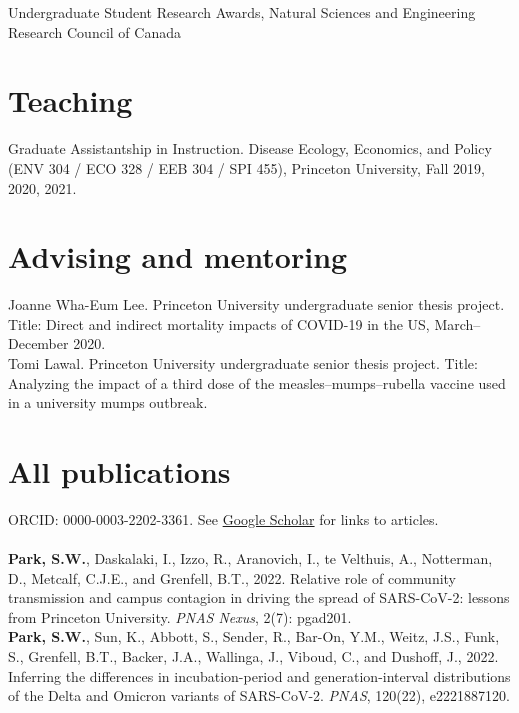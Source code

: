 \documentclass[11pt]{article} %
\begin{document}
 Undergraduate Student Research Awards, Natural Sciences and Engineering Research Council of Canada

\section*{Teaching}

 Graduate Assistantship in Instruction. Disease Ecology, Economics, and Policy (ENV 304 / ECO 328 / EEB 304 / SPI 455), Princeton University, Fall 2019, 2020, 2021.

\section*{Advising and mentoring}

 Joanne Wha-Eum Lee. Princeton University undergraduate senior thesis project. Title: Direct and indirect mortality impacts of COVID-19 in the US, March--December 2020.\\

 Tomi Lawal. Princeton University undergraduate senior thesis project. Title: Analyzing the impact of a third dose of the measles--mumps--rubella vaccine used in a university mumps outbreak.

\section*{All publications}

ORCID: 0000-0003-2202-3361. See \href{https://scholar.google.com/citations?user=ZSCrs78AAAAJ&hl=en&oi=ao}{Google Scholar} for links to articles.\\
\\

 \textbf{Park, S.W.}, Daskalaki, I., Izzo, R., Aranovich, I., te Velthuis, A., Notterman, D., Metcalf, C.J.E., and Grenfell, B.T., 2022. Relative role of community transmission and campus contagion in driving the spread of SARS-CoV-2: lessons from Princeton University. \textit{PNAS Nexus}, 2(7): pgad201.\\

 \textbf{Park, S.W.}, Sun, K., Abbott, S., Sender, R., Bar-On, Y.M., Weitz, J.S., Funk, S., Grenfell, B.T., Backer, J.A., Wallinga, J., Viboud, C., and Dushoff, J., 2022. Inferring the differences in incubation-period and generation-interval distributions of the Delta and Omicron variants of SARS-CoV-2. \textit{PNAS}, 120(22), e2221887120.\\
\end{document}
